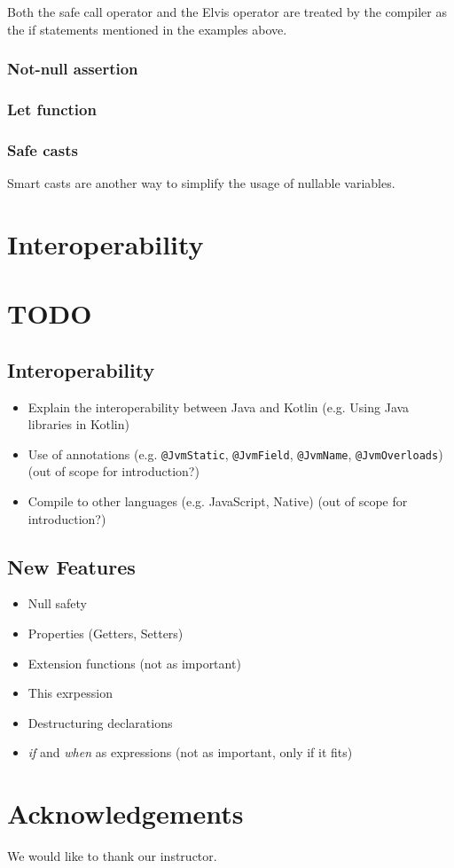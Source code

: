 \documentclass[a4paper, 11pt]{article}
\begin{document}
  Both the safe call operator and the Elvis operator are treated by the compiler as the if statements mentioned in the examples above. %

\subsubsection{Not-null assertion}

\subsubsection{Let function}

\subsubsection{Safe casts}
  Smart casts are another way to simplify the usage of nullable variables.


\section{Interoperability}

\section{TODO}


\subsection{Interoperability}
  \begin{itemize}
    \item Explain the interoperability between Java and Kotlin (e.g. Using Java libraries in Kotlin)
    \item Use of annotations (e.g. \texttt{@JvmStatic}, \texttt{@JvmField}, \texttt{@JvmName}, \texttt{@JvmOverloads}) (out of scope for introduction?)
    \item Compile to other languages (e.g. JavaScript, Native) (out of scope for introduction?)
  \end{itemize}

\subsection{New Features}
\begin{itemize}
  \item Null safety
  \item Properties (Getters, Setters)
  \item Extension functions (not as important)
  \item This exrpession
  \item Destructuring declarations
  \item \textit{if} and \textit{when} as expressions (not as important, only if it fits)
\end{itemize}

\section*{Acknowledgements}
  We would like to thank our instructor.
\end{document}
